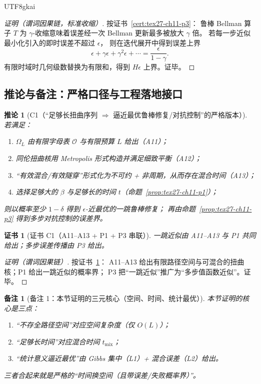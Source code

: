 \documentclass[12pt]{article}
\newtheorem{corollary}{推论}[section]
\newtheorem{remark}{备注}[section]
\newtheorem{Certificate}{证书}[section]
\begin{document}
\begin{CJK*}{UTF8}{gkai}
\begin{proof}[证明（谓词因果链，标准收缩）]
按证书~\ref{cert:tex27-ch11-p3}：
鲁棒 Bellman 算子 $T$ 为 $\gamma$-收缩意味着误差经一次 Bellman 更新最多被放大 $\gamma$ 倍。
若每一步近似最小化引入的即时误差不超过 $\epsilon$，
则在迭代展开中得到误差上界
\[
  \epsilon+\gamma\epsilon+\gamma^2\epsilon+\cdots=\frac{\epsilon}{1-\gamma}.
\]
有限时域时几何级数替换为有限和，得到 $H\epsilon$ 上界。证毕。
\end{proof}

\subsection{推论与备注：严格口径与工程落地接口}
\label{subsec:tex27-ch11-others}

\begin{corollary}[C1（“足够长扭曲序列 $\Rightarrow$ 逼近最优鲁棒修复/对抗控制”的严格版本）]
\label{cor:tex27-ch11-c1}
若满足：
\begin{enumerate}
  \item $\Omega_L$ 由有限字母表 $\mathcal{O}$ 与有限预算 $L$ 给出（A11）；
  \item 同伦扭曲核用 Metropolis 形式构造并满足细致平衡（A12）；
  \item “有效混合/有效隧穿”形式化为不可约 + 非周期，从而存在混合时间（A13）；
  \item 选择足够大的 $\beta$ 与足够长的时间 $t$（命题~\ref{prop:tex27-ch11-p1}）；
\end{enumerate}
则以概率至少 $1-\delta$ 得到 $\epsilon$-近最优的一跳鲁棒修复；
再由命题~\ref{prop:tex27-ch11-p3} 得到多步对抗控制的误差界。
\end{corollary}

\begin{Certificate}[证书 C1（A11--A13 + P1 + P3 串联）]
\label{cert:tex27-ch11-c1}
一跳近似由 A11--A13 与 P1 共同给出；多步误差传播由 P3 给出。
\end{Certificate}

\begin{proof}[证明（谓词因果链）]
按证书~\ref{cert:tex27-ch11-c1}：
A11--A13 给出有限路径空间与可混合的扭曲核；P1 给出一跳近似的概率界；
P3 把“一跳近似”推广为“多步值函数近似”。证毕。
\end{proof}

\begin{remark}[备注 1：本节证明的三元核心（空间、时间、统计最优）]
\label{rem:tex27-ch11-r1}
本节证明的核心是三点：
\begin{enumerate}
  \item “不存全路径空间”对应空间复杂度（仅 $O(L)$）；
  \item “足够长时间”对应混合时间 $t_{\mathrm{mix}}$；
  \item “统计意义逼近最优”由 Gibbs 集中（L1）+ 混合误差（L2）给出。
\end{enumerate}
三者合起来就是严格的“时间换空间（且带误差/失败概率界）”。
\end{remark}


\end{CJK*}
\end{document}
